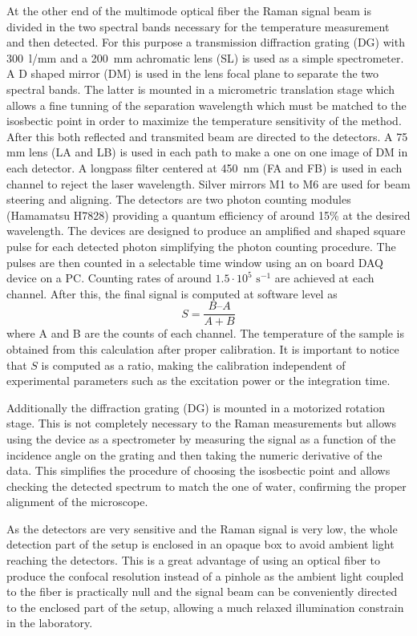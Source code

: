 \documentclass[twocolumn]{svjour3}       %
\begin{document}
At the other end of the multimode optical fiber the Raman signal beam is divided in the two spectral bands necessary for the temperature measurement and then detected. For this purpose a transmission diffraction grating (DG) with 300~l/mm and a 200~mm achromatic lens (SL) is used as a simple spectrometer. A D shaped mirror (DM) is used in the lens focal plane to separate the two spectral bands. The latter is mounted in a micrometric translation stage which allows a fine tunning of the separation wavelength which must be matched to the isosbectic point in order to maximize the temperature sensitivity of the method. After this both reflected and transmited beam are directed to the detectors. A 75 mm lens (LA and LB) is used in each path to make a one on one image of DM in each detector. A longpass filter centered at 450~nm (FA and FB) is used in each channel to reject the laser wavelength. Silver mirrors M1 to M6 are used for beam steering and aligning. The detectors are two photon counting modules (Hamamatsu H7828) providing a quantum efficiency of around 15\% at the desired wavelength. The devices are designed to produce an amplified and shaped square pulse for each detected photon simplifying the photon counting procedure. The pulses are then counted in a selectable time window using an on board DAQ device on a PC. Counting rates of around $1.5 \cdot 10^5 \,\,\mathrm{s}^{-1}$ are achieved at each channel. After this, the final signal is computed at software level as
\begin{equation}\label{eq:S}
S = \frac{B – A}{A + B}
\end{equation}
where A and B are the counts of each channel. The temperature of the sample is obtained from this calculation after proper calibration.  It is important to notice that $S$ is computed as a ratio, making the calibration independent of experimental parameters such as the excitation power or the integration time.

Additionally the diffraction grating (DG) is mounted in a motorized rotation stage.  This is not completely necessary to the Raman measurements but allows using the device as a spectrometer by measuring the signal as a function of the incidence angle on the grating and then taking the numeric derivative of the data. This simplifies the procedure of choosing the isosbectic point and allows checking the detected spectrum to match the one of water, confirming the proper alignment of the microscope. 

As the detectors are very sensitive and the Raman signal is very low, the whole detection part of the setup is enclosed in an opaque box to avoid ambient light reaching the detectors. This is a great advantage of using an optical fiber to produce the confocal resolution instead of a pinhole as the ambient light coupled to the fiber is practically null and the signal beam can be conveniently directed to the enclosed part of the setup, allowing a much relaxed illumination constrain in the laboratory. 
\end{document}
